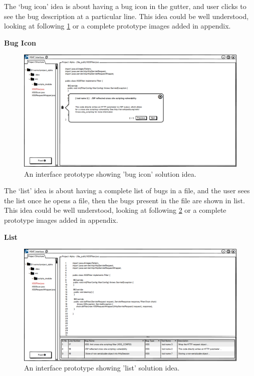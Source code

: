 The ‘bug icon’ idea is about having a bug icon in the gutter, and user clicks to see the bug description at a particular line. This idea could be well understood, looking at following \ref{fig:S31_next} or a complete prototype images added in appendix.

\textbf{Bug Icon}
\begin{figure}[hbt!]
	\centering
	\includegraphics[width=\linewidth]{figures/solution_ideas_snaps/S31_next}
	\caption{An interface prototype showing 'bug icon' solution idea.}
	\label{fig:S31_next}
\end{figure} 

The ‘list’ idea is about having a complete list of bugs in a file, and the user sees the list once he opens a file, then the bugs present in the file are shown in list. This idea could be well understood, looking at following \ref{fig:S31_list} or a complete prototype images added in appendix.

\textbf{List}
\begin{figure}[hbt!]
	\centering
	\includegraphics[width=\linewidth]{figures/solution_ideas_snaps/S31_list}
	\caption{An interface prototype showing 'list' solution idea.}
	\label{fig:S31_list}
\end{figure} 

